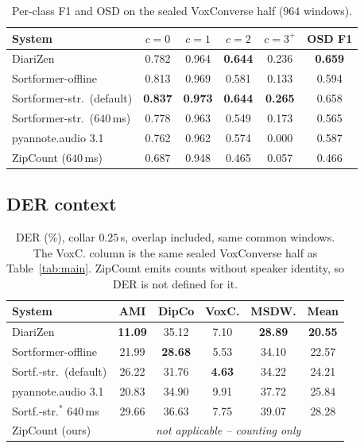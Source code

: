 \documentclass[journal]{IEEEtran}
\newcommand{\best}[1]{\textbf{#1}}
\newcommand{\sys}{ZipCount}
\begin{document}
\begin{table}[t]
\centering
\caption{Per-class F1 and OSD on the sealed VoxConverse half ($964$
windows).}
\label{tab:perclass}
\small
\setlength{\tabcolsep}{3.5pt}
\begin{tabular}{lccccc}
\toprule
System & $c\!=\!0$ & $c\!=\!1$ & $c\!=\!2$ & $c\!=\!3^{+}$ & OSD F1 \\
\midrule
DiariZen                     & 0.782 & 0.964 & \best{0.644} & 0.236 & \best{0.659} \\
Sortformer-offline           & 0.813 & 0.969 & 0.581 & 0.133 & 0.594 \\
Sortformer-str.\ (default)   & \best{0.837} & \best{0.973} & \best{0.644} & \best{0.265} & 0.658 \\
Sortformer-str.\ ($640$\,ms) & 0.778 & 0.963 & 0.549 & 0.173 & 0.565 \\
pyannote.audio 3.1           & 0.762 & 0.962 & 0.574 & 0.000 & 0.587 \\
\sys{} ($640$\,ms)           & 0.687 & 0.948 & 0.465 & 0.057 & 0.466 \\
\bottomrule
\end{tabular}
\end{table}

\subsection{DER context}
\begin{table}[t]
\centering
\caption{DER (\%), collar $0.25$\,s, overlap included, same common windows.
The VoxC. column is the same sealed VoxConverse half as Table~\ref{tab:main}.
\sys{} emits counts without speaker identity, so DER is not defined for it.}
\label{tab:der}
\small
\setlength{\tabcolsep}{4pt}
\begin{tabular}{lccccc}
\toprule
System & AMI & DipCo & VoxC. & MSDW. & Mean \\
\midrule
DiariZen                   & \best{11.09} & 35.12 & 7.10 & \best{28.89} & \best{20.55} \\
Sortformer-offline         & 21.99 & \best{28.68} & 5.53 & 34.10 & 22.57 \\
Sortf.-str.\ (default)     & 26.22 & 31.76 & \best{4.63} & 34.22 & 24.21 \\
pyannote.audio 3.1         & 20.83 & 34.90 & 9.91 & 37.72 & 25.84 \\
Sortf.-str.$^{*}$ 640\,ms  & 29.66 & 36.63 & 7.75 & 39.07 & 28.28 \\
\midrule
\sys{} (ours)                & \multicolumn{5}{c}{\emph{not applicable -- counting only}} \\
\bottomrule
\end{tabular}
\end{table}
\end{document}
